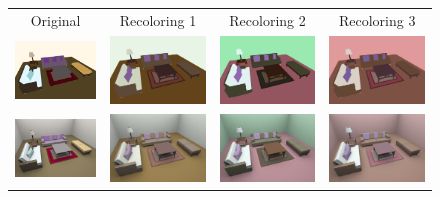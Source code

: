 \begin{figure}[ht]
\begin{tabular}{c|ccc} 
Original&Recoloring 1&Recoloring 2&Recoloring 3\vspace{0.4em}\\
\includegraphics[width=.23\linewidth]{figs/3dscene/original}&\includegraphics[width=.23\linewidth]{figs/3dscene/recolored_00}&\includegraphics[width=.23\linewidth]{figs/3dscene/recolored_01}&\includegraphics[width=.23\linewidth]{figs/3dscene/recolored_05}\vspace{0.4em}\\
\includegraphics[width=.23\linewidth]{figs/3dscene/original_pbrt}&\includegraphics[width=.23\linewidth]{figs/3dscene/recolored_00_pbrt}&\includegraphics[width=.23\linewidth]{figs/3dscene/recolored_01_pbrt}&\includegraphics[width=.23\linewidth]{figs/3dscene/recolored_05_pbrt}\vspace{0.4em}\\
\end{tabular}


\end{figure}
